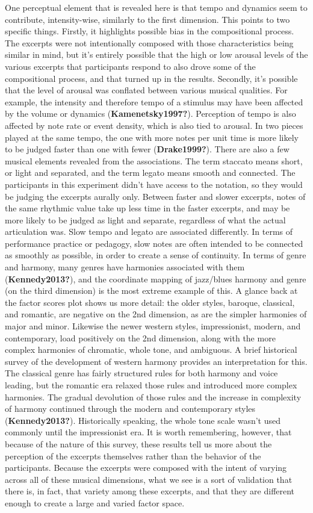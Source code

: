 \documentclass[
  english,
  man,floatsintext]{apa6}
\begin{document}
One perceptual element that is revealed here is that tempo and dynamics seem to contribute, intensity-wise, similarly to the first dimension. This points to two specific things. Firstly, it highlights possible bias in the compositional process. The excerpts were not intentionally composed with those characteristics being similar in mind, but it's entirely possible that the high or low arousal levels of the various excerpts that participants respond to also drove some of the compositional process, and that turned up in the results. Secondly, it's possible that the level of arousal was conflated between various musical qualities. For example, the intensity and therefore tempo of a stimulus may have been affected by the volume or dynamics (\textbf{Kamenetsky1997?}). Perception of tempo is also affected by note rate or event density, which is also tied to arousal. In two pieces played at the same tempo, the one with more notes per unit time is more likely to be judged faster than one with fewer (\textbf{Drake1999?}).
There are also a few musical elements revealed from the associations. The term staccato means short, or light and separated, and the term legato means smooth and connected. The participants in this experiment didn't have access to the notation, so they would be judging the excerpts aurally only. Between faster and slower excerpts, notes of the same rhythmic value take up less time in the faster excerpts, and may be more likely to be judged as light and separate, regardless of what the actual articulation was. Slow tempo and legato are associated differently. In terms of performance practice or pedagogy, slow notes are often intended to be connected as smoothly as possible, in order to create a sense of continuity. In terms of genre and harmony, many genres have harmonies associated with them (\textbf{Kennedy2013?}), and the coordinate mapping of jazz/blues harmony and genre (on the third dimension) is the most extreme example of this. A glance back at the factor scores plot shows us more detail: the older styles, baroque, classical, and romantic, are negative on the 2nd dimension, as are the simpler harmonies of major and minor. Likewise the newer western styles, impressionist, modern, and contemporary, load positively on the 2nd dimension, along with the more complex harmonies of chromatic, whole tone, and ambiguous. A brief historical survey of the development of western harmony provides an interpretation for this. The classical genre has fairly structured rules for both harmony and voice leading, but the romantic era relaxed those rules and introduced more complex harmonies. The gradual devolution of those rules and the increase in complexity of harmony continued through the modern and contemporary styles (\textbf{Kennedy2013?}). Historically speaking, the whole tone scale wasn't used commonly until the impressionist era.
It is worth remembering, however, that because of the nature of this survey, these results tell us more about the perception of the excerpts themselves rather than the behavior of the participants. Because the excerpts were composed with the intent of varying across all of these musical dimensions, what we see is a sort of validation that there is, in fact, that variety among these excerpts, and that they are different enough to create a large and varied factor space.
\end{document}
